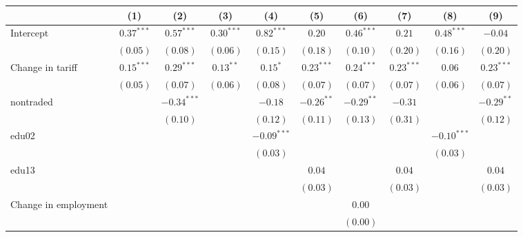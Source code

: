 
\begin{tabular}{l c c c c c c c c c }
\hline
 & (1) & (2) & (3) & (4) & (5) & (6) & (7) & (8) & (9) \\
\hline
Intercept          & $0.37^{***}$ & $0.57^{***}$  & $0.30^{***}$ & $0.82^{***}$  & $0.20$       & $0.46^{***}$ & $0.21$       & $0.48^{***}$  & $-0.04$      \\
                     & $(0.05)$     & $(0.08)$      & $(0.06)$     & $(0.15)$      & $(0.18)$     & $(0.10)$     & $(0.20)$     & $(0.16)$      & $(0.20)$     \\
Change in tariff              & $0.15^{***}$ & $0.29^{***}$  & $0.13^{**}$  & $0.15^{*}$    & $0.23^{***}$ & $0.24^{***}$ & $0.23^{***}$ & $0.06$        & $0.23^{***}$ \\
                     & $(0.05)$     & $(0.07)$      & $(0.06)$     & $(0.08)$      & $(0.07)$     & $(0.07)$     & $(0.07)$     & $(0.06)$      & $(0.07)$     \\
nontraded            &              & $-0.34^{***}$ &              & $-0.18$       & $-0.26^{**}$ & $-0.29^{**}$ & $-0.31$      &               & $-0.29^{**}$ \\
                     &              & $(0.10)$      &              & $(0.12)$      & $(0.11)$     & $(0.13)$     & $(0.31)$     &               & $(0.12)$     \\
edu02                &              &               &              & $-0.09^{***}$ &              &              &              & $-0.10^{***}$ &              \\
                     &              &               &              & $(0.03)$      &              &              &              & $(0.03)$      &              \\
edu13                &              &               &              &               & $0.04$       &              & $0.04$       &               & $0.04$       \\
                     &              &               &              &               & $(0.03)$     &              & $(0.03)$     &               & $(0.03)$     \\
Change in employment              &              &               &              &               &              & $0.00$       &              &               &              \\
                     &              &               &              &               &              & $(0.00)$     &              &               &              \\

\end{tabular}
